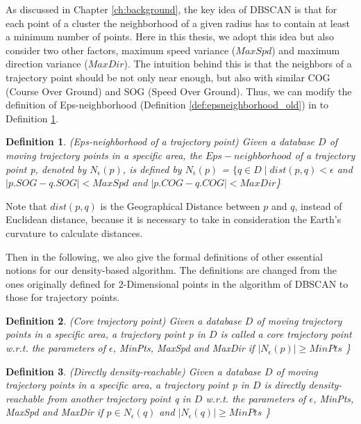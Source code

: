 \documentclass[12pt,glossary]{dalcsthesis}
\newtheorem{definition}{Definition}
\begin{document}

As discussed in Chapter \ref{ch:background}, the key idea of DBSCAN \cite{DBScan96} is that for each point of a cluster the neighborhood of a given radius has to contain at least a minimum number of points. Here in this thesis, we adopt this idea but also consider two other factors, maximum speed variance ($MaxSpd$) and maximum direction variance ($MaxDir$). The intuition behind this is that the neighbors of a trajectory point should be not only near enough, but also with similar COG (Course Over Ground) and SOG (Speed Over Ground). Thus, we can modify the definition of Eps-neighborhood (Definition \ref{def:epsneighborhood_old}) in \cite{DBScan96} to Definition \ref{def:epsneighborhood_new}.


\begin{definition}
\label{def:epsneighborhood_new}
(Eps-neighborhood of a trajectory point)
Given a database $D$ of moving trajectory points in a specific area, the $Eps-neighborhood$ of a trajectory point p, denoted by $N_{\epsilon}(p)$, is defined by $N_{\epsilon}(p)$ = $\{ q\in D \mid dist(p, q) < \epsilon$ and $\left|p.SOG-q.SOG\right|<MaxSpd$ and $\left|p.COG-q.COG\right|<MaxDir$\}
\end{definition}


Note that $dist(p,q)$ is the Geographical Distance \cite{gpsDistance} between $p$ and $q$, instead of Euclidean distance, because it is necessary to take in consideration the Earth's curvature to calculate distances.

Then in the following, we also give the formal definitions of other essential notions for our density-based algorithm. The definitions are changed from the ones originally defined for 2-Dimensional points in the algorithm of DBSCAN \cite{DBScan96} to those for trajectory points.

\begin{definition}
\label{def:core_trajectory_point}
(Core trajectory point)
Given a database $D$ of moving trajectory points in a specific area, a trajectory point p in $D$ is called a core trajectory point w.r.t. the parameters of $\epsilon$, MinPts, MaxSpd and MaxDir if $\left|N_{\epsilon}(p)\right| \geq MinPts$ \}
\end{definition}

\begin{definition}
\label{def:directly_density_reachable}
(Directly density-reachable)
Given a database $D$ of moving trajectory points in a specific area, a trajectory point p in $D$ is directly density-reachable from another trajectory point q in $D$ w.r.t. the parameters of $\epsilon$, MinPts, MaxSpd and MaxDir if $p \in N_{\epsilon}(q) $ and $\left|N_{\epsilon}(q)\right| \geq MinPts$ \}
\end{definition}
\end{document}
